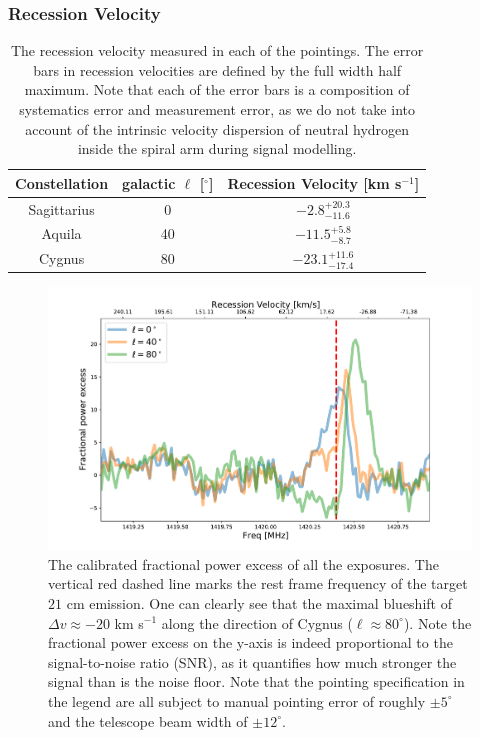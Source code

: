 \documentclass[12pt]{article}
\begin{document}
    \subsubsection{Recession Velocity}
    \begin{table}
    \centering
    \begin{tabular}{c|c|c}
            Constellation & galactic $\ell$ [$^\circ$] & Recession Velocity [km s$^{-1}$]\\
            \hline \hline
            Sagittarius & 0  & $-2.8^{+20.3}_{-11.6}$ \\
            \hline
            Aquila  & 40 & $-11.5^{+5.8}_{-8.7}$ \\
            \hline
             Cygnus & 80 & $-23.1^{+11.6}_{-17.4}$ \\
             \hline
        \end{tabular}
        \caption{The recession velocity measured in each of the pointings. The error bars in recession velocities are defined by the full width half maximum. Note that each of the error bars is a composition of systematics error and measurement error, as we do not take into account of the intrinsic velocity dispersion of neutral hydrogen inside the spiral arm during signal modelling. }
        \label{tab: recession-velocity}
    \end{table}
    \begin{figure}
	    \centering
	    \includegraphics[width=\textwidth]{plots/mw-21cm-map-2.pdf}
	    \caption{The calibrated fractional power excess of all the exposures. The vertical red dashed line marks the rest frame frequency of the target $21$ cm emission. One can clearly see that the maximal blueshift of $\Delta v \approx -20$ km s$^{-1}$ along the direction of Cygnus ($\ell \approx 80^{\circ}$). Note the fractional power excess on the y-axis is indeed proportional to the signal-to-noise ratio (SNR), as it quantifies how much stronger the signal than is the noise floor. Note that the pointing specification in the legend are all subject to manual pointing error of roughly $\pm 5^\circ$ and the telescope beam width of $\pm 12^\circ$. } 
	    \label{fig: obs-result}
	\end{figure}
\end{document}
